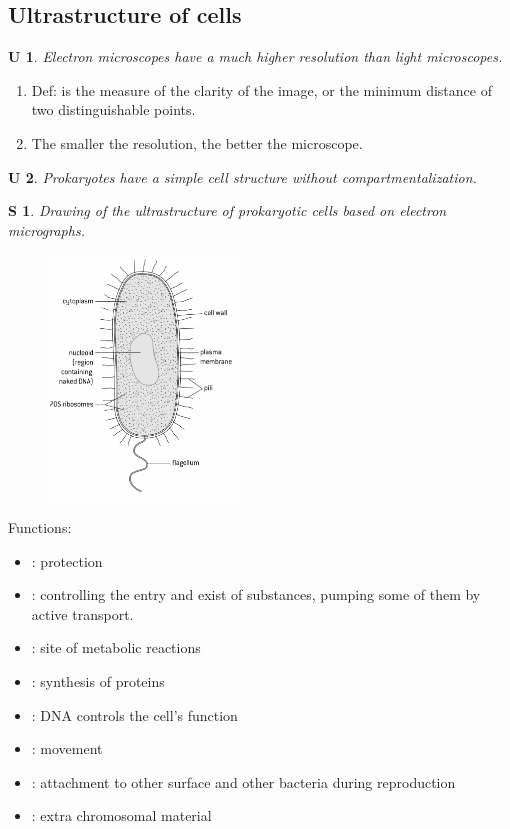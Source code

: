\documentclass[12pt, a4paper]{article}
\newtheorem{und}{U}[subsection]
\newtheorem{skl}{S}[subsection]
\begin{document}
\subsection{Ultrastructure of cells}
\begin{und}
    Electron microscopes have a much higher resolution than light microscopes. 
\end{und}
\begin{enumerate}
    \item Def: \textbf{\color{red}{Resolution}} is the measure of the clarity of the image, or the minimum distance of two distinguishable points. 
    \item The smaller the resolution, the better the microscope. 
\end{enumerate}
\begin{und}
    Prokaryotes have a simple cell structure without compartmentalization. 
\end{und}
\begin{skl} Drawing of the ultrastructure of prokaryotic cells based on electron micrographs. \end{skl}
\begin{multicols}{2}
\begin{figure}[H]
        \center
        \includegraphics[width=0.45\textwidth]{fig1.2.png}
\end{figure}
Functions: 
    \begin{itemize}
        \item \textbf{\color{red}{Cell wall}}: protection
        \item \textbf{\color{red}{Plasma membrane}}: controlling the entry and exist of substances, pumping some of them by active transport. 
        \item \textbf{\color{red}{Cytoplasm}}: site of metabolic reactions
        \item \textbf{\color{red}{Ribosomes}}: synthesis of proteins
        \item \textbf{\color{red}{Nucleoid/Nuclear region}}: DNA controls the cell's function
        \item \textbf{\color{red}{Flagellum}}: movement
        \item \textbf{\color{red}{Pili}}: attachment to other surface and other bacteria during reproduction
        \item \textbf{\color{red}{Plasmids}}: extra chromosomal material
    \end{itemize} 
\end{multicols} 
\end{document}
